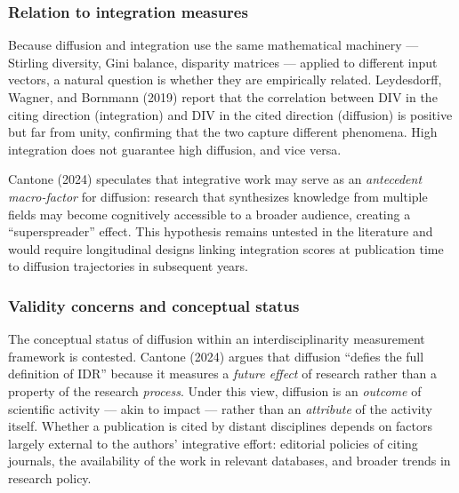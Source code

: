 \documentclass[
]{article}
\begin{document}
\hypertarget{relation-to-integration-measures}{%
\subsubsection{Relation to integration
measures}\label{relation-to-integration-measures}}

Because diffusion and integration use the same mathematical machinery
--- Stirling diversity, Gini balance, disparity matrices --- applied to
different input vectors, a natural question is whether they are
empirically related. Leydesdorff, Wagner, and Bornmann (2019) report
that the correlation between DIV in the citing direction (integration)
and DIV in the cited direction (diffusion) is positive but far from
unity, confirming that the two capture different phenomena. High
integration does not guarantee high diffusion, and vice versa.

Cantone (2024) speculates that integrative work may serve as an
\emph{antecedent macro-factor} for diffusion: research that synthesizes
knowledge from multiple fields may become cognitively accessible to a
broader audience, creating a ``superspreader'' effect. This hypothesis
remains untested in the literature and would require longitudinal
designs linking integration scores at publication time to diffusion
trajectories in subsequent years.

\hypertarget{validity-concerns-and-conceptual-status}{%
\subsubsection{Validity concerns and conceptual
status}\label{validity-concerns-and-conceptual-status}}

The conceptual status of diffusion within an interdisciplinarity
measurement framework is contested. Cantone (2024) argues that diffusion
``defies the full definition of IDR'' because it measures a \emph{future
effect} of research rather than a property of the research
\emph{process}. Under this view, diffusion is an \emph{outcome} of
scientific activity --- akin to impact --- rather than an
\emph{attribute} of the activity itself. Whether a publication is cited
by distant disciplines depends on factors largely external to the
authors' integrative effort: editorial policies of citing journals, the
availability of the work in relevant databases, and broader trends in
research policy.
\end{document}
